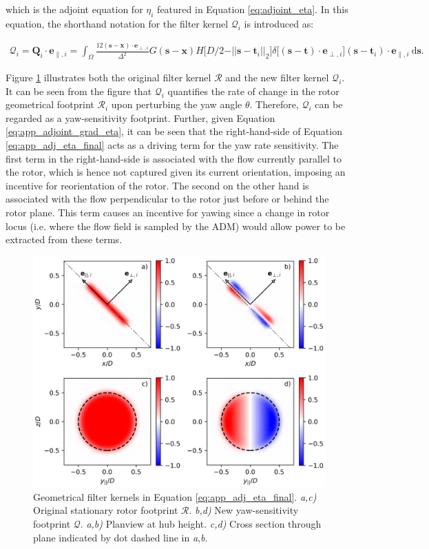 \documentclass[energies,article,submit,moreauthors,latex,10pt,a4paper]{mdpi}
\newcommand{\ds}{~\text{d}\boldsymbol{s}}
\newcommand{\bs}[1]{\boldsymbol{#1}}
\newcommand{\sint}{\int_{\Omega}}
\newcommand{\R}{\mathscr{R}}
\newcommand{\eperpi}{\bs{e}_{\perp,i}}
\newcommand{\etransi}{\bs{e}_{\parallel,i}}
\newcommand{\diracdelta}{{\delta}}
\begin{document}
\noindent which is the adjoint equation for $\eta_i$ featured in Equation \eqref{eq:adjoint_eta}. In this equation, the shorthand notation for the filter kernel $\mathscr{Q}_i$ is introduced as:

\begin{align}
\mathscr{Q}_i = \bs{Q}_i \cdot \etransi = \sint \frac{12 (\bs{s} - \bs{x})\cdot \eperpi}{\Delta^2} G(\bs{s} - \bs{x})  H\big[D/2 - \vert\vert \bs{s} - \bs{t}_i \vert\vert_2 \big] \diracdelta\big[(\bs{s} - \bs{t})\cdot \eperpi \big]  (\bs{s} - \bs{t}_i) \cdot \etransi \ds.
\end{align}

\noindent Figure \ref{fig:filters} illustrates both the original filter kernel $\R$ and the new filter kernel $\mathscr{Q}_i$. It can be seen from the figure that $\mathscr{Q}_i$ quantifies the rate of change in the rotor geometrical footprint $\R_i$ upon perturbing the yaw angle $\theta$. Therefore, $\mathscr{Q}_i$ can be regarded as a yaw-sensitivity footprint.
Further, given Equation \eqref{eq:app_adjoint_grad_eta}, it can be seen that the right-hand-side of Equation \eqref{eq:app_adj_eta_final} acts as a driving term for the yaw rate sensitivity. The first term in the right-hand-side is associated with the flow currently parallel to the rotor, which is hence not captured given its current orientation, imposing an incentive for reorientation of the rotor. The second on the other hand is associated with the flow perpendicular to the rotor just before or behind the rotor plane. This term causes an incentive for yawing since a change in rotor locus (i.e. where the flow field is sampled by the ADM) would allow power to be extracted from these terms. 

\begin{figure}
	\includegraphics[width=\textwidth]{figure17}
	\caption{Geometrical filter kernels in Equation \eqref{eq:app_adj_eta_final}. \emph{a,c)} Original stationary rotor footprint $\R$. \emph{b,d)} New yaw-sensitivity footprint $\mathscr{Q}$. \emph{a,b)} Planview at hub height. \emph{c,d)} Cross section through plane indicated by dot dashed line in \emph{a},\emph{b}. \label{fig:filters}}
\end{figure}
\end{document}
